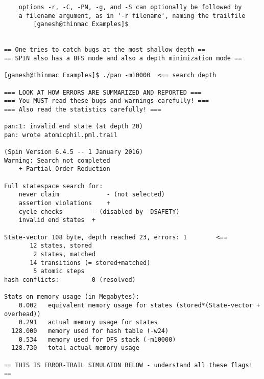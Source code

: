 \documentclass[11pt]{article}
\begin{document}
\begin{scriptsize}
\begin{verbatim}
	options -r, -C, -PN, -g, and -S can optionally be followed by
	a filename argument, as in '-r filename', naming the trailfile
        [ganesh@thinmac Examples]$


== One tries to catch bugs at the most shallow depth ==
== SPIN also has a BFS mode and also a depth minimization mode ==

[ganesh@thinmac Examples]$ ./pan -m10000  <== search depth 

=== LOOK AT HOW ERRORS ARE SUMMARIZED AND REPORTED ===
=== You MUST read these bugs and warnings carefully! ===
=== Also read the statistics carefully! ===

pan:1: invalid end state (at depth 20)
pan: wrote atomicphil.pml.trail

(Spin Version 6.4.5 -- 1 January 2016)
Warning: Search not completed
	+ Partial Order Reduction

Full statespace search for:
	never claim         	- (not selected)         
	assertion violations	+                        
	cycle checks       	- (disabled by -DSAFETY) 
	invalid end states	+                        
 
State-vector 108 byte, depth reached 23, errors: 1        <==
       12 states, stored
        2 states, matched
       14 transitions (= stored+matched)
        5 atomic steps
hash conflicts:         0 (resolved)

Stats on memory usage (in Megabytes):
    0.002	equivalent memory usage for states (stored*(State-vector + overhead))
    0.291	actual memory usage for states
  128.000	memory used for hash table (-w24)
    0.534	memory used for DFS stack (-m10000)
  128.730	total actual memory usage

== THIS IS ERROR-TRAIL SIMULATON BELOW - understand all these flags! ==


\end{verbatim}
\end{scriptsize}
\end{document}
